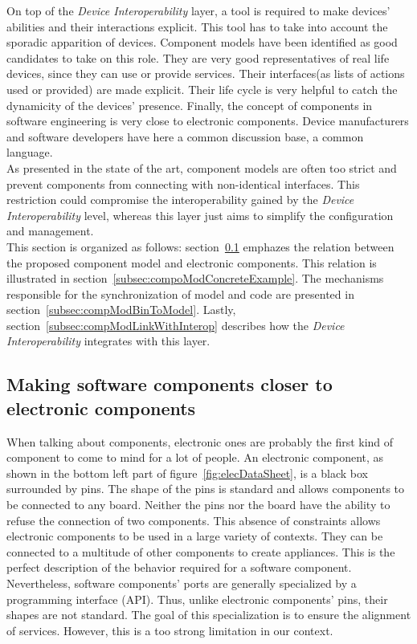 On top of the {\it Device Interoperability} layer, a tool is required to make devices' abilities and their interactions explicit. This tool has to take into account the sporadic apparition of devices. Component models have been identified as good candidates to take on this role. They are very good representatives of real life devices, since they can use or provide services. Their interfaces(as lists of actions used or provided) are made explicit. Their life cycle is very helpful to catch the dynamicity of the devices' presence. Finally, the concept of components in software engineering is very close to electronic components.
Device manufacturers and software developers have here a common discussion base, a common language.\\
As presented in the state of the art, component models are often too strict and prevent components from connecting with non-identical interfaces. This restriction could compromise the interoperability gained by the {\it Device Interoperability} level, whereas this layer just aims to simplify the configuration and management.\\

This section is organized as follows: section~\ref{subsec:makeSoftCloserToElec} emphazes the relation between the proposed component model and electronic components. This relation is illustrated in section~\ref{subsec:compoModConcreteExample}. The mechanisms responsible for the synchronization of model and code are presented in section~\ref{subsec:compModBinToModel}. Lastly, section~\ref{subsec:compModLinkWithInterop} describes how the {\it Device Interoperability} integrates with this layer.


\subsection{Making software components closer to electronic components}
\label{subsec:makeSoftCloserToElec}

When talking about components, electronic ones are probably the first kind of component to come to mind for a lot of people. An electronic component, as shown in the bottom left part of figure~\ref{fig:elecDataSheet}, is a black box surrounded by pins. The shape of the pins is standard and allows components to be connected to any board. Neither the pins nor the board have the ability to refuse the connection of two components. This absence of constraints allows electronic components to be used in a large variety of contexts. They can be connected to a multitude of other components to create appliances. This is the perfect description of the behavior required for a software component.\\
Nevertheless, software components' ports are generally specialized by a programming interface (API). Thus, unlike electronic components' pins, their shapes are not standard. The goal of this specialization is to ensure the alignment of services. However, this is a too strong limitation in our context.\\

